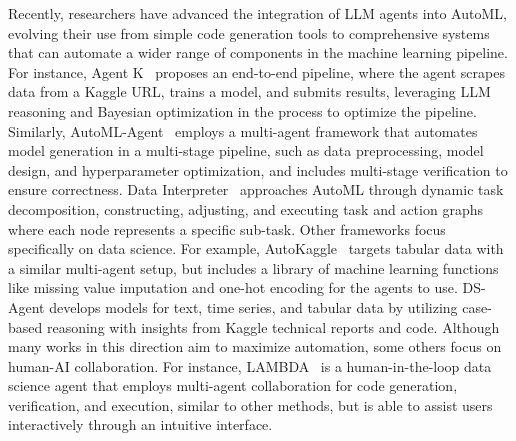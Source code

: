 Recently, researchers have advanced the integration of LLM agents into AutoML, evolving their use from simple code generation tools to comprehensive systems that can automate a wider range of components in the machine learning pipeline. For instance, Agent K~\citep{grosnit2024kaggleagent} proposes an end-to-end pipeline, where the agent scrapes data from a Kaggle URL, trains a model, and submits results, leveraging LLM reasoning and Bayesian optimization in the process to optimize the pipeline. Similarly, AutoML-Agent~\citep{trirat2024automlagent} employs a multi-agent framework that automates model generation in a multi-stage pipeline, such as data preprocessing, model design, and hyperparameter optimization, and includes multi-stage verification to ensure correctness. Data Interpreter~\citep{hong2024datainterpreter} approaches AutoML through dynamic task decomposition, constructing, adjusting, and executing task and action graphs where each node represents a specific sub-task. Other frameworks focus specifically on data science. For example, AutoKaggle~\citep{li2024autokaggle} targets tabular data with a similar multi-agent setup, but includes a library of machine learning functions like missing value imputation and one-hot encoding for the agents to use. DS-Agent\citep{guo2024dsagent} develops models for text, time series, and tabular data by utilizing case-based reasoning with insights from Kaggle technical reports and code. Although many works in this direction aim to maximize automation, some others focus on human-AI collaboration. For instance, LAMBDA~\citep{sun2024lambda} is a human-in-the-loop data science agent that employs multi-agent collaboration for code generation, verification, and execution, similar to other methods, but is able to assist users interactively through an intuitive interface.
